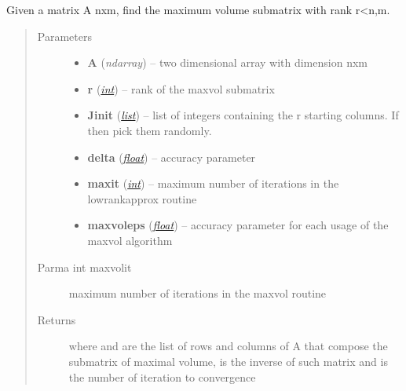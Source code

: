 \documentclass[a4paper,10pt,english]{sphinxmanual}
\begin{document}
\begin{fulllineitems}
\label{api-core:TensorToolbox.core.lowrankapprox}
Given a matrix A nxm, find the maximum volume submatrix with rank r\textless{}n,m.
\begin{quote}\begin{description}
\item[{Parameters}] \leavevmode\begin{itemize}
\item {} 
\textbf{A} (\emph{ndarray}) -- two dimensional array with dimension nxm

\item {} 
\textbf{r} (\href{http://docs.python.org/library/functions.html\#int}{\emph{int}}) -- rank of the maxvol submatrix

\item {} 
\textbf{Jinit} (\href{http://docs.python.org/library/functions.html\#list}{\emph{list}}) -- list of integers containing the r starting columns. If  then pick them randomly.

\item {} 
\textbf{delta} (\href{http://docs.python.org/library/functions.html\#float}{\emph{float}}) -- accuracy parameter

\item {} 
\textbf{maxit} (\href{http://docs.python.org/library/functions.html\#int}{\emph{int}}) -- maximum number of iterations in the lowrankapprox routine

\item {} 
\textbf{maxvoleps} (\href{http://docs.python.org/library/functions.html\#float}{\emph{float}}) -- accuracy parameter for each usage of the maxvol algorithm

\end{itemize}

\item[{Parma int maxvolit}] \leavevmode
maximum number of iterations in the maxvol routine

\item[{Returns}] \leavevmode
{} where  and  are the list of rows and columns of A that compose the submatrix of maximal volume,  is the inverse of such matrix and  is the number of iteration to convergence

\end{description}\end{quote}

\end{fulllineitems}
\end{document}
